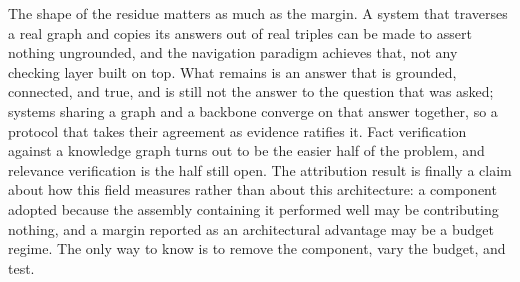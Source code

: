 The shape of the residue matters as much as the margin. A system that
traverses a real graph and copies its answers out of real triples can be
made to assert nothing ungrounded, and the navigation paradigm achieves
that, not any checking layer built on top. What remains is an answer
that is grounded, connected, and true, and is still not the answer to
the question that was asked; systems sharing a graph and a backbone
converge on that answer together, so a protocol that takes their
agreement as evidence ratifies it. Fact verification against a knowledge
graph turns out to be the easier half of the problem, and relevance
verification is the half still open. The attribution result is finally a
claim about how this field measures rather than about this architecture:
a component adopted because the assembly containing it performed well
may be contributing nothing, and a margin reported as an architectural
advantage may be a budget regime. The only way to know is to remove the
component, vary the budget, and test.

